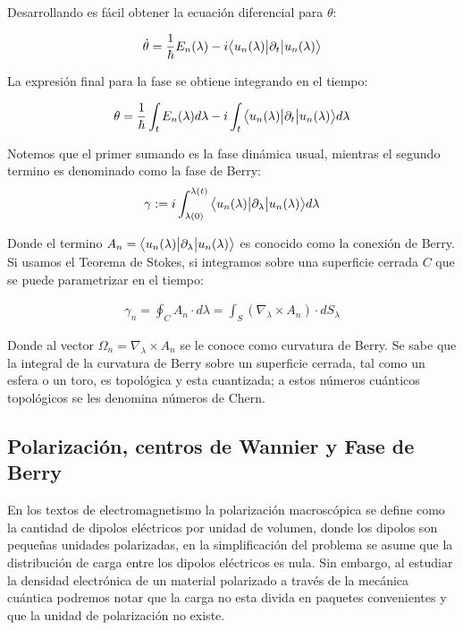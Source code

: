 Desarrollando es fácil obtener la ecuación diferencial para $\theta$:

\begin{align}
    \dot{\theta} = \frac{1}{\hbar} E_n(\lambda) - i \big \langle{u_n(\lambda)}\big | {\partial_t} \big | {u_n(\lambda)} \big \rangle
\end{align}

La expresión final para la fase se obtiene integrando en el tiempo:

\begin{align}
   \theta = \frac{1}{\hbar} \int_t E_n(\lambda) d\lambda - i \int_t \big \langle{u_n(\lambda)}\big | {\partial_t} \big | {u_n(\lambda)} \big \rangle d\lambda
\end{align}

Notemos que el primer sumando es la fase dinámica usual, mientras el segundo termino es denominado como la fase de Berry:
\begin{align}
    \gamma := i \int_{\lambda(0)}^{\lambda(t)} \big \langle{u_n(\lambda)}\big | {\partial_\lambda} \big | {u_n(\lambda)} \big \rangle d\lambda
\end{align}

Donde el termino $A_n = \big \langle{u_n(\lambda)}\big | {\partial_\lambda} \big | {u_n(\lambda)} \big \rangle$ es conocido como la conexión de Berry. Si usamos el Teorema de Stokes, si integramos sobre una superficie cerrada $C$ que se puede parametrizar en el tiempo:

\begin{align}
    \gamma_n = \oint_C A_n \cdot d\lambda = \int_S (\nabla_\lambda \times A_n) \cdot dS_\lambda
\end{align}


Donde al vector $\Omega_n = \nabla_\lambda \times A_n$ se le conoce como curvatura de Berry. Se sabe que la integral de la curvatura de Berry sobre un superficie cerrada, tal como un esfera o un toro, es topológica y esta cuantizada; a estos números cuánticos topológicos se les denomina números de Chern.

\subsection{Polarización, centros de Wannier y Fase de Berry}

En los textos de electromagnetismo la polarización macroscópica se define como la cantidad de dipolos eléctricos por unidad de volumen, donde los dipolos son pequeñas unidades polarizadas, en la simplificación del problema se asume que la distribución de carga entre los dipolos eléctricos es nula. Sin embargo, al estudiar la densidad electrónica de un material polarizado a través de la mecánica cuántica podremos notar que la carga no esta divida en paquetes convenientes y que la unidad de polarización no existe. 

